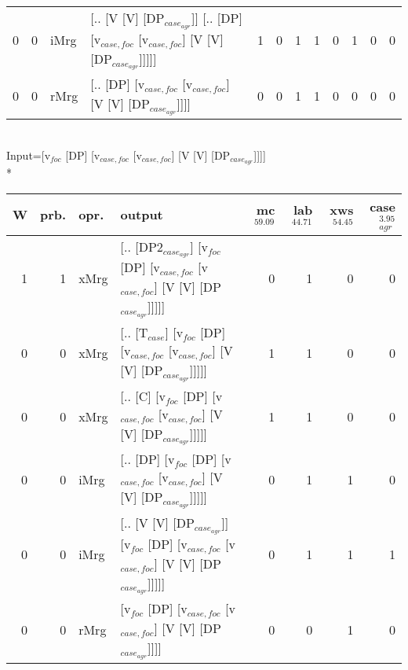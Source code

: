 \begin{tabularx}{\linewidth}{rrlXrrrrrrrr}
   0 &   0 & iMrg & [.. [V [V] [DP$_{case_{agr}}$]] [.. [DP] [v$_{case,foc}$ [v$_{case,foc}$] [V [V] [DP$_{case_{agr}}$]]]]]                           &            1 &              0 &             1 &             1 &             0 &                  1 &                0 &              0 \\
   0 &   0 & rMrg & [.. [DP] [v$_{case,foc}$ [v$_{case,foc}$] [V [V] [DP$_{case_{agr}}$]]]]                                                      &            0 &              0 &             1 &             1 &             0 &                  0 &                0 &              0 \\
\hline
\end{tabularx}\endgroup\\
\begingroup\scriptsize Input=[v$_{foc}$ [DP] [v$_{case,foc}$ [v$_{case,foc}$] [V [V] [DP$_{case_{agr}}$]]]]\\*
\begin{tabularx}{\linewidth}{rrlXrrrr}
\hline
   W &   prb. & opr.   & output                                                                                  &   mc$^{59.09}$ &   lab$^{44.71}$ &   xws$^{54.45}$ &   case$_{agr}^{3.95}$ \\
\hline
   1 &   1 & xMrg & [.. [DP2$_{case_{agr}}$] [v$_{foc}$ [DP] [v$_{case,foc}$ [v$_{case,foc}$] [V [V] [DP$_{case_{agr}}$]]]]]        &            0 &             1 &             0 &                  0 \\
   0 &   0 & xMrg & [.. [T$_{case}$] [v$_{foc}$ [DP] [v$_{case,foc}$ [v$_{case,foc}$] [V [V] [DP$_{case_{agr}}$]]]]]              &            1 &             1 &             0 &                  0 \\
   0 &   0 & xMrg & [.. [C] [v$_{foc}$ [DP] [v$_{case,foc}$ [v$_{case,foc}$] [V [V] [DP$_{case_{agr}}$]]]]]                   &            1 &             1 &             0 &                  0 \\
   0 &   0 & iMrg & [.. [DP] [v$_{foc}$ [DP] [v$_{case,foc}$ [v$_{case,foc}$] [V [V] [DP$_{case_{agr}}$]]]]]                  &            0 &             1 &             1 &                  0 \\
   0 &   0 & iMrg & [.. [V [V] [DP$_{case_{agr}}$]] [v$_{foc}$ [DP] [v$_{case,foc}$ [v$_{case,foc}$] [V [V] [DP$_{case_{agr}}$]]]]] &            0 &             1 &             1 &                  1 \\
   0 &   0 & rMrg & [v$_{foc}$ [DP] [v$_{case,foc}$ [v$_{case,foc}$] [V [V] [DP$_{case_{agr}}$]]]]                            &            0 &             0 &             1 &                  0 \\
\hline
\end{tabularx}\endgroup\\
